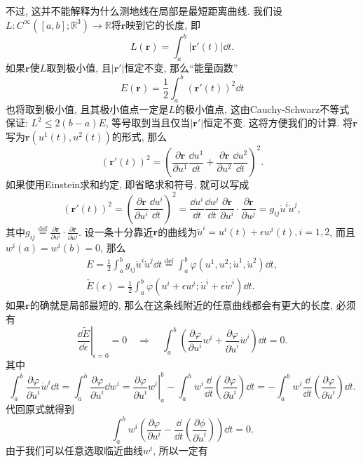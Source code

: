 \documentclass[./main.tex]{subfiles}
\begin{document}
不过, 这并不能解释为什么测地线在局部是最短距离曲线. 我们设\(L:C^{\infty}([a,b];\mathbb{R}^3)\to\mathbb{R}\)将\(\mathbf{r}\)映到它的长度, 即
\[
    L(\mathbf{r})=\int_a^b|\mathbf{r}'(t)|\dd t.
\]
如果\(\mathbf{r}\)使\(L\)取到极小值, 且\(|\mathbf{r}'|\)恒定不变, 那么``能量函数''
\[
    E(\mathbf{r})=\frac{1}{2}\int_a^b(\mathbf{r}'(t))^2\dd t
\]
也将取到极小值, 且其极小值点一定是\(L\)的极小值点, 这由Cauchy-Schwarz不等式保证: \(L^2\le2(b-a)E\), 等号取到当且仅当\(|\mathbf{r}'|\)恒定不变. 这将方便我们的计算. 将\(\mathbf{r}\)写为\(\mathbf{r}(u^1(t),u^2(t))\)的形式, 那么
\[
    (\mathbf{r}'(t))^2=\left(\frac{\partial\mathbf{r}}{\partial u^1}\frac{\dd u^1}{\dd t}+\frac{\partial\mathbf{r}}{\partial u^2}\frac{\dd u^2}{\dd t}\right)^2.
\]
如果使用Einstein求和约定, 即省略求和符号, 就可以写成
\[
    (\mathbf{r}'(t))^2=\left(\frac{\partial\mathbf{r}}{\partial u^i}\frac{\dd u^i}{\dd t}\right)^2=\frac{\dd u^i}{\dd t}\frac{\dd u^j}{\dd t}\frac{\partial\mathbf{r}}{\partial u^i}\cdot\frac{\partial\mathbf{r}}{\partial u^j}=g_{ij}\dot{u}^i\dot{u}^j,
\]
其中\(g_{ij}\overset{\text{def}}{=}\frac{\partial\mathbf{r}}{\partial u^i}\cdot\frac{\partial\mathbf{r}}{\partial u^j}\). 设一条十分靠近\(\mathbf{r}\)的曲线为\(\tilde{u}^i=u^i(t)+\epsilon w^i(t),i=1,2\), 而且\(w^i(a)=w^i(b)=0\), 那么
\begin{gather}\label{equ:4}
    E=\frac12\int_a^bg_{ij}\dot{u}^i\dot{u}^j\dd t\overset{\text{def}}{=}\int_a^b\varphi(u^1,u^2;\dot u^1,\dot u^2)\dd t,\\
    \tilde{E}(\epsilon)=\frac12\int_a^b\varphi(u^i+\epsilon w^i;\dot u^i+\epsilon\dot w^i)\dd t.\nonumber
\end{gather}
如果\(\mathbf{r}\)的确就是局部最短的, 那么在这条线附近的任意曲线都会有更大的长度, 必须有
\[
    \left.\frac{\dd\tilde E}{\dd\epsilon}\right|_{\epsilon=0}=0\quad\Longrightarrow\quad\int_a^b\left(\frac{\partial\varphi}{\partial u^i}w^i+\frac{\partial\varphi}{\partial\dot u^i}\dot w^i\right)\dd t=0.
\]
其中
\[
    \int_a^b \frac{\partial\varphi}{\partial\dot u^i}\dot w^i\dd t=\int_a^b\frac{\partial\varphi}{\partial\dot u^i}\dd w^i=\left.\frac{\partial\varphi}{\partial\dot u^i}w^i\right|_a^b-\int_a^bw^i\frac{\dd}{\dd t}\left(\frac{\partial\varphi}{\partial\dot u^i}\right)\dd t=-\int_a^bw^i\frac{\dd}{\dd t}\left(\frac{\partial\varphi}{\partial\dot u^i}\right)\dd t.
\]
代回原式就得到
\[
    \int_a^bw^i\left(\frac{\partial\varphi}{\partial u^i}-\frac{\dd}{\dd t}\left(\frac{\partial\phi}{\partial\dot u^i}\right)\right)\dd t=0.
\]
由于我们可以任意选取临近曲线\(w^i\), 所以一定有
\end{document}

